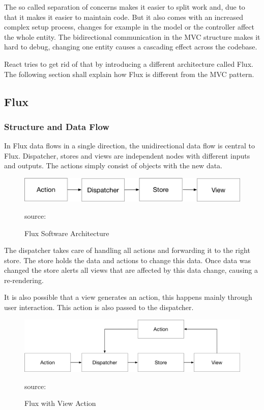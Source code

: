 The so called separation of concerns makes it easier to split work and, due to that it makes it easier to maintain code. But it also comes with an increased complex setup process, changes for example in the model or the controller affect the whole entity. The bidirectional communication in the MVC structure makes it hard to debug, changing one entity  causes a cascading effect across the codebase.

React tries to get rid of that by introducing a different architecture called Flux. The following section shall explain how Flux is different from the MVC pattern.

\subsection{Flux}

\subsubsection{Structure and Data Flow}

In Flux data flows in a single direction, the unidirectional data flow is central to Flux. Dispatcher, stores and views are independent nodes with different inputs and outputs. The actions simply consist of objects with the new data.


\begin{figure}[H]
	\centering
	\includegraphics[width=0.8\linewidth]{bilder/grundlagen/UniDirection.png}
	\caption{Flux Software Architecture} source:\cite{FLUX}
	\label{fig:FLUX}
\end{figure}

The dispatcher takes care of handling all actions and forwarding it to the right store. The store holds the data and actions to change this data. Once data was changed the store alerts all views that are affected by this data change, causing a re-rendering.

It is also possible that a view generates an action, this happens mainly through user interaction. This action is also passed to the dispatcher. 


\begin{figure}[H]
	\centering
	\includegraphics[width=0.8\linewidth]{bilder/grundlagen/uniDirection2.png}
	\caption{Flux with View Action} source:\cite{FluxAction}
	\label{fig:FA}
\end{figure}

